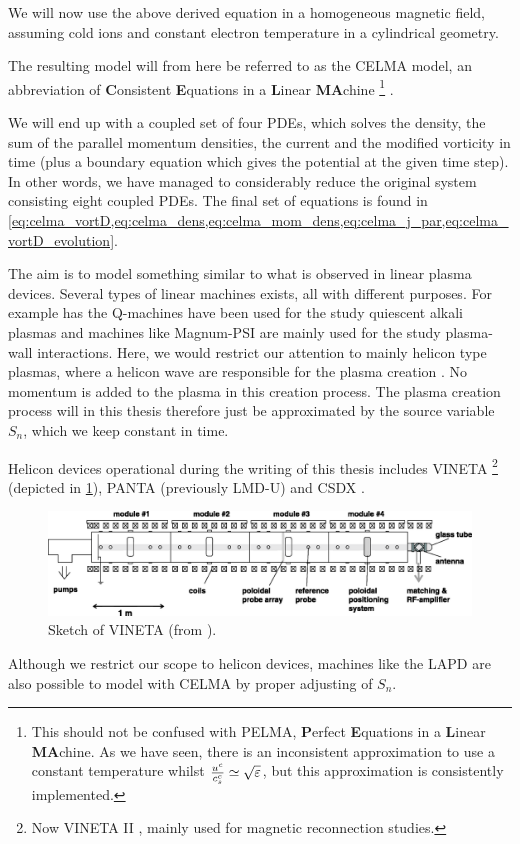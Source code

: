 We will now use the above derived equation in a homogeneous magnetic field, assuming cold ions and constant electron temperature in a cylindrical geometry.

The resulting model will from here be referred to as the CELMA model, an abbreviation of \textbf{C}onsistent \textbf{E}quations in a \textbf{L}inear \textbf{MA}chine%
\footnote{
    This should not be confused with PELMA, \textbf{P}erfect \textbf{E}quations in a \textbf{L}inear \textbf{MA}chine.
    As we have seen, there is an inconsistent approximation to use a constant temperature whilst $\frac{u^c}{c^c_s}\simeq\sqrt{\varepsilon}$, but this approximation is consistently implemented.
}%
.

We will end up with a coupled set of four PDEs, which solves the density, the sum of the parallel momentum densities, the current and the modified vorticity in time (plus a boundary equation which gives the potential at the given time step).
In other words, we have managed to considerably reduce the original system consisting eight coupled PDEs.
The final set of equations is found in \cref{eq:celma_vortD,eq:celma_dens,eq:celma_mom_dens,eq:celma_j_par,eq:celma_vortD_evolution}.

The aim is to model something similar to what is observed in linear plasma devices.
Several types of linear machines exists, all with different purposes.
For example has the Q-machines have been used for the study quiescent alkali plasmas \cite{Nielsen1996} and machines like Magnum-PSI \cite{Rapp2010} are mainly used for the study plasma-wall interactions.
Here, we would restrict our attention to mainly helicon type plasmas, where a helicon wave are responsible for the plasma creation \cite{Boswell1984,Shamrai1996}.
No momentum is added to the plasma in this creation process.
The plasma creation process will in this thesis therefore just be approximated by the source variable $S_n$, which we keep constant in time.

Helicon devices operational during the writing of this thesis includes VINETA \cite{Schroder2005}%
\footnote{Now VINETA II \cite{Bohlin2014}, mainly used for magnetic reconnection studies.}%
%
(depicted in \cref{fig:VINETA}), PANTA (previously LMD-U) \cite{Oldenburger2012} and CSDX \cite{Tynan2004a}.
%
\begin{figure}[htb]
    \centering
    \includegraphics[width=1.0\textwidth]{fig/VINETA}
    \caption{Sketch of VINETA (from \cite{Schroder2005}).}
    \label{fig:VINETA}
\end{figure}
%
Although we restrict our scope to helicon devices, machines like the LAPD \cite{Gekelman1991,Gekelman2016} are also possible to model with CELMA by proper adjusting of $S_n$.

